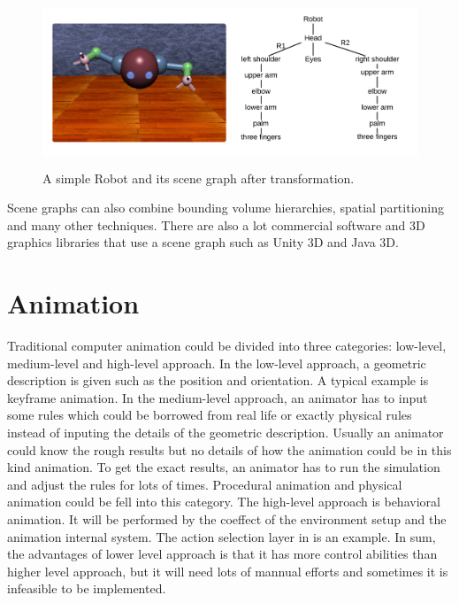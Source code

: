 \begin{figure}[ht!]
\centering
\includegraphics[width=12cm,height=5cm]{figures/scenegraph2.png}
\caption{A simple Robot and its scene graph after transformation.}
\label{fig:scenegraph2}
\end{figure}
Scene graphs can also combine bounding volume hierarchies, spatial
partitioning and many other techniques. There are also a lot commercial
software and 3D graphics libraries that use a scene graph such as Unity 3D and
Java 3D.




\section{Animation} %
\label{sec:animation}



Traditional computer animation could be divided into three categories: low-level, medium-level and high-level approach\cite{alan3D}. In the low-level approach, a geometric description is given such as the position and orientation. A typical example is keyframe animation.  In the medium-level approach, an animator has to input some rules which could be borrowed from real life or exactly physical rules instead of inputing the details of the geometric description. Usually an animator could know the rough results but no details of how the animation could be in this kind animation. To get the exact results, an animator has to run the simulation and adjust the rules for lots of times. Procedural animation and physical animation could be fell into this category. The high-level approach is behavioral animation.\cite{animationSlides} It will be performed by the coeffect of the environment setup and the animation internal system. The action selection layer in \cite{steering} is an example. In sum, the advantages of lower level approach is that it has more control abilities than higher level approach, but it will need lots of mannual efforts and sometimes it is infeasible to be implemented.
 
